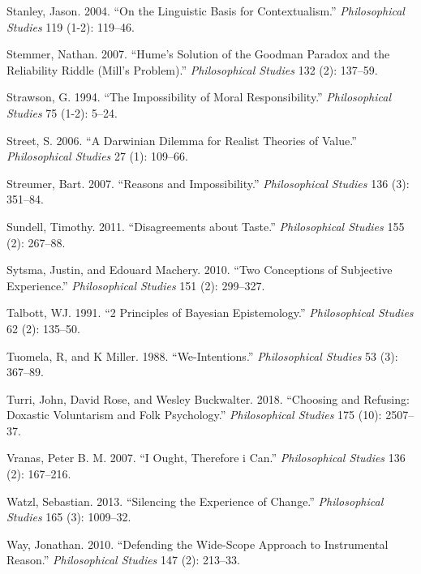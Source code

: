 \documentclass[
  10pt,
  letterpaper,
  DIV=11,
  numbers=noendperiod,
  twoside]{scrartcl}
\newlength{\cslhangindent}
\newenvironment{CSLReferences}[2] %
 {\begin{list}{}{%
  \setlength{\itemindent}{0pt}
  \setlength{\leftmargin}{0pt}
  \setlength{\parsep}{0pt}
  \ifodd #1
   \setlength{\leftmargin}{\cslhangindent}
   \setlength{\itemindent}{-1\cslhangindent}
  \fi
  \setlength{\itemsep}{#2\baselineskip}}}
 {\end{list}}
\begin{document}
\begin{CSLReferences}{1}{0}
Stanley, Jason. 2004. {``On the Linguistic Basis for Contextualism.''}
\emph{Philosophical Studies} 119 (1-2): 119--46.

Stemmer, Nathan. 2007. {``Hume's Solution of the Goodman Paradox and the
Reliability Riddle (Mill's Problem).''} \emph{Philosophical Studies} 132
(2): 137--59.

Strawson, G. 1994. {``The Impossibility of Moral Responsibility.''}
\emph{Philosophical Studies} 75 (1-2): 5--24.

Street, S. 2006. {``A Darwinian Dilemma for Realist Theories of
Value.''} \emph{Philosophical Studies} 27 (1): 109--66.

Streumer, Bart. 2007. {``Reasons and Impossibility.''}
\emph{Philosophical Studies} 136 (3): 351--84.

Sundell, Timothy. 2011. {``Disagreements about Taste.''}
\emph{Philosophical Studies} 155 (2): 267--88.

Sytsma, Justin, and Edouard Machery. 2010. {``Two Conceptions of
Subjective Experience.''} \emph{Philosophical Studies} 151 (2):
299--327.

Talbott, WJ. 1991. {``2 Principles of Bayesian Epistemology.''}
\emph{Philosophical Studies} 62 (2): 135--50.

Tuomela, R, and K Miller. 1988. {``We-Intentions.''} \emph{Philosophical
Studies} 53 (3): 367--89.

Turri, John, David Rose, and Wesley Buckwalter. 2018. {``Choosing and
Refusing: Doxastic Voluntarism and Folk Psychology.''}
\emph{Philosophical Studies} 175 (10): 2507--37.

Vranas, Peter B. M. 2007. {``I Ought, Therefore i Can.''}
\emph{Philosophical Studies} 136 (2): 167--216.

Watzl, Sebastian. 2013. {``Silencing the Experience of Change.''}
\emph{Philosophical Studies} 165 (3): 1009--32.

Way, Jonathan. 2010. {``Defending the Wide-Scope Approach to
Instrumental Reason.''} \emph{Philosophical Studies} 147 (2): 213--33.


\end{CSLReferences}
\end{document}
